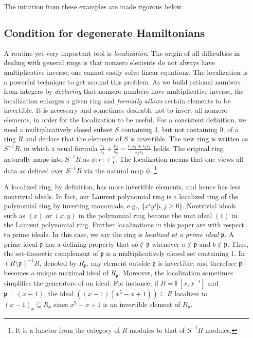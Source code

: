 \documentclass[letterpaper,12pt]{amsart}
\theoremstyle{definition} \newtheorem{defn}{Definition}
\theoremstyle{definition} \newtheorem{rem}{Remark}
\theoremstyle{definition} \newtheorem{example}{Example}
\newcommand{\FF}{\mathbb{F}}
\newcommand{\pp}{\mathfrak{p}}
\begin{document}
The intuition from these examples are made rigorous below.

\subsection{Condition for degenerate Hamiltonians}

A routine yet very important tool is \emph{localization}.
The origin of all difficulties in dealing with general rings
is that nonzero elements do not always have multiplicative inverse;
one cannot easily solve linear equations.
The localization is a powerful technique to get around this problem.
As we build rational numbers from integers by \emph{declaring} that
nonzero numbers have multiplicative inverse,
the localization enlarges a given ring
and \emph{formally allows} certain elements to be invertible.
It is necessary and sometimes desirable not to invert all nonzero elements,
in order for the localization to be useful.
For a consistent definition, we need a multiplicatively closed subset $S$
containing 1, but not containing 0,
of a ring $R$ and declare that the elements of $S$ is invertible.
The new ring is written as $S^{-1}R$,
in which a usual formula $\frac{r_1}{s_1} + \frac{r_2}{s_2} = \frac{r_1 s_2 + r_2 s_1}{s_1 s_2}$ holds.
The original ring naturally maps into $S^{-1}R$ as $\phi : r \mapsto \frac{r}{1}$.
The localization means that one views all data as defined over $S^{-1}R$ via the natural map $\phi$.%
\footnote{It is a functor from the category of $R$-modules to that of $S^{-1}R$-modules.}

A localized ring, by definition, has more invertible elements, and hence has less nontrivial ideals.
In fact, our Laurent polynomial ring is a localized ring of the polynomial ring by inverting monomials,
e.g., $\{ x^i y^j | i,j \ge 0 \}$.
Nontrivial ideals such as $(x)$ or $(x,y)$ in the polynomial ring
become the unit ideal $(1)$ in the Laurent polynomial ring.
Further localizations in this paper are with respect to prime ideals.
In this case, we say the ring is \emph{localized at a prime ideal $\pp$}.
A prime ideal $\pp$ has a defining property that
$a b \notin \pp$ whenever $a \notin \pp$ and $b \notin \pp$.
Thus, the set-theoretic complement of $\pp$ is a multiplicatively closed set containing 1.
In $(R\setminus \pp)^{-1}R$, denoted by $R_\pp$, any element outside $\pp$ is invertible,
and therefore $\pp$ becomes a unique maximal ideal of $R_\pp$.
Moreover, the localization sometimes simplifies the generators of an ideal.
For instance, if $R=\FF[x,x^{-1}]$ and $\pp = (x-1)$,
the ideal $((x -1)(x^5-x+1)) \subseteq R$ localizes to $(x-1)_\pp \subseteq R_\pp$
since $x^5-x+1$ is an invertible element of $R_\pp$.
\end{document}
